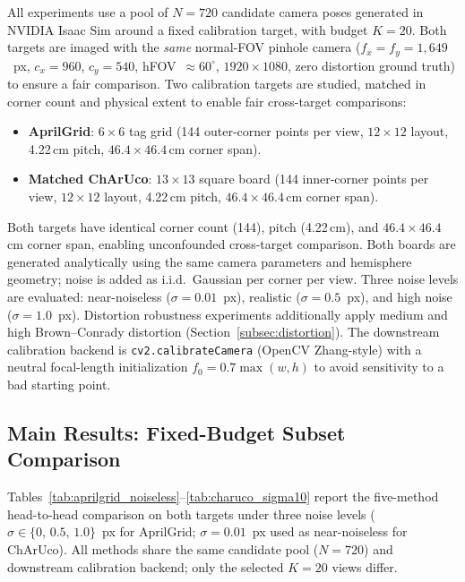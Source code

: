 \documentclass[11pt]{article}
\begin{document}
All experiments use a pool of $N = 720$ candidate camera poses generated in
NVIDIA Isaac Sim around a fixed calibration target, with budget $K = 20$.
Both targets are imaged with the \emph{same} normal-FOV pinhole camera
($f_x = f_y = 1{,}649$~px, $c_x{=}960$, $c_y{=}540$, hFOV~${\approx}60^\circ$,
$1920\times1080$, zero distortion ground truth) to ensure a fair comparison.
Two calibration targets are studied, matched in corner count and physical extent
to enable fair cross-target comparisons:
\begin{itemize}
    \item \textbf{AprilGrid}: $6{\times}6$ tag grid (144 outer-corner points per
    view, $12{\times}12$ layout, 4.22\,cm pitch, $46.4{\times}46.4$\,cm corner span).
    \item \textbf{Matched ChArUco}: $13{\times}13$ square board (144 inner-corner points per
    view, $12{\times}12$ layout, 4.22\,cm pitch, $46.4{\times}46.4$\,cm corner span).
\end{itemize}
Both targets have identical corner count (144), pitch (4.22\,cm), and
$46.4\times46.4$\,cm corner span, enabling unconfounded cross-target comparison.
Both boards are generated analytically using the same camera parameters and
hemisphere geometry; noise is added as i.i.d.\ Gaussian per corner per view.
Three noise levels are evaluated: near-noiseless ($\sigma = 0.01$~px),
realistic ($\sigma = 0.5$~px), and high noise ($\sigma = 1.0$~px).
Distortion robustness experiments additionally apply medium and high
Brown--Conrady distortion (Section~\ref{subsec:distortion}).
The downstream calibration backend is \texttt{cv2.calibrateCamera} (OpenCV
Zhang-style) with a neutral focal-length initialization
$f_0 = 0.7\max(w,h)$ to avoid sensitivity to a bad starting point.

\subsection{Main Results: Fixed-Budget Subset Comparison}
\label{subsec:fixed_backend}

Tables~\ref{tab:aprilgrid_noiseless}--\ref{tab:charuco_sigma10} report the
five-method head-to-head comparison on both targets under three noise levels
($\sigma \in \{0,\,0.5,\,1.0\}$~px for AprilGrid; $\sigma{=}0.01$~px used
as near-noiseless for ChArUco).
All methods share the same candidate pool ($N{=}720$) and downstream
calibration backend; only the selected $K{=}20$ views differ.
\end{document}
